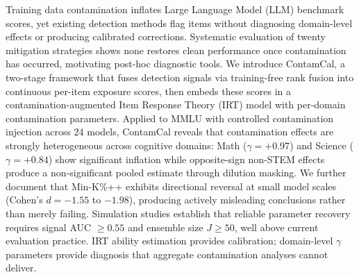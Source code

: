 Training data contamination inflates Large Language Model (LLM) benchmark scores, yet existing detection methods flag items without diagnosing domain-level effects or producing calibrated corrections. Systematic evaluation of twenty mitigation strategies shows none restores clean performance once contamination has occurred, motivating post-hoc diagnostic tools. We introduce ContamCal, a two-stage framework that fuses detection signals via training-free rank fusion into continuous per-item exposure scores, then embeds these scores in a contamination-augmented Item Response Theory (IRT) model with per-domain contamination parameters. Applied to MMLU with controlled contamination injection across 24 models, ContamCal reveals that contamination effects are strongly heterogeneous across cognitive domains: Math ($\gamma = +0.97$) and Science ($\gamma = +0.84$) show significant inflation while opposite-sign non-STEM effects produce a non-significant pooled estimate through dilution masking. We further document that Min-K\%++ exhibits directional reversal at small model scales (Cohen's $d = -1.55$ to $-1.98$), producing actively misleading conclusions rather than merely failing. Simulation studies establish that reliable parameter recovery requires signal AUC $\geq 0.55$ and ensemble size $J \geq 50$, well above current evaluation practice. IRT ability estimation provides calibration; domain-level $\gamma$ parameters provide diagnosis that aggregate contamination analyses cannot deliver.
